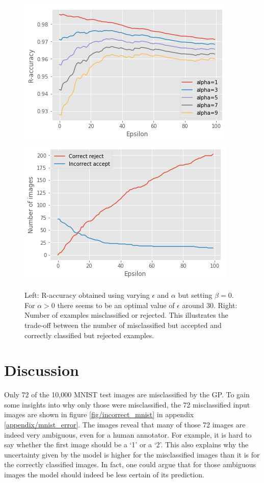 \documentclass{article}
\begin{document}
\begin{figure}[h]
	\centering
	\includegraphics[scale=0.38]{r_accs_alpha_mnist}
	\includegraphics[scale=0.38]{r_acc_mnist}
	\caption{Left: R-accuracy obtained using varying $\epsilon$ and $\alpha$ but setting $\beta=0$. For $\alpha>0$ there seems to be an optimal value of $\epsilon$ around 30. Right: Number of examples misclassified or rejected. This illustrates the trade-off between the number of misclassified but accepted and correctly classified but rejected examples.}
	\label{fig/r_accs_alpha_mnist}
\end{figure}

\section{Discussion}
Only 72 of the 10,000 MNIST test images are misclassified by the GP. To gain some insights into why only those were misclassified, the 72 misclassified input images are shown in figure \ref{fig/incorrect_mnist} in appendix \ref{appendix/mnist_error}. The images reveal that many of those 72 images are indeed very ambiguous, even for a human annotator. For example, it is hard to say whether the first image should be a `1' or a `2'. This also explains why the uncertainty given by the model is higher for the misclassified images than it is for the correctly classified images. In fact, one could argue that for those ambiguous images the model should indeed be less certain of its prediction.
\end{document}
